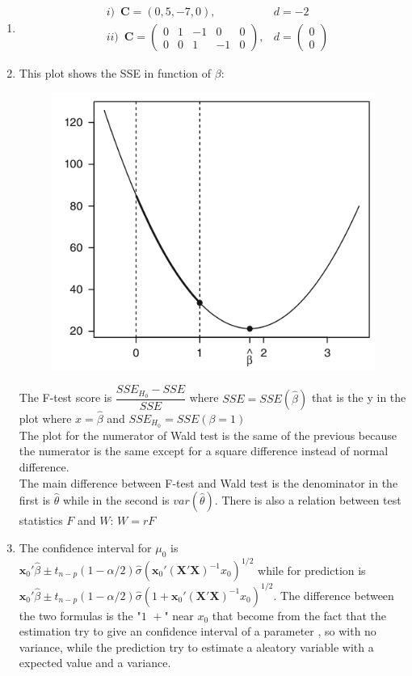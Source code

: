 \documentclass[10pt,a4paper]{article}
\author{Michele De Vita}
\begin{document}
	\begin{enumerate}
		\item  
		\begin{align*}
	 &i) \,\,\, \mathbf{C} = (0,  5, -7, 0), &d = -2  \\
		& ii) \,\,\, \mathbf{C} = \left( \begin{matrix}
		0 & 1 & -1 & 0 & 0 \\ 
		0 & 0 & 1 & -1 & 0 
		\end{matrix} \right) ,  &d= \left( \begin{matrix}
		0 \\ 
		0
		\end{matrix} \right)
		\end{align*}
		\item 
		This plot shows the SSE in function of $ \beta $:
		\begin{figure}[H]
			\centering
			\includegraphics[width=0.7\linewidth]{plot_ftest}
		\end{figure}
		The F-test score is $ \dfrac{SSE_{H_0} - SSE}{SSE} $ where $ SSE = SSE(\hat{\beta}) $ that is the y in the plot where $ x = \hat{\beta} $ and $ SSE_{H_0} = SSE(\beta = 1) $\\
		The plot for the numerator of Wald test is the same of the previous because the numerator is the same except for a square difference instead of normal difference.\\
		The main difference between F-test and Wald test is the denominator in the first is $ \hat{\theta} $ while in the second is $ var(\hat{\theta}) $. There is also a relation between test statistics $ F $ and $ W $: $ W = rF $
		\item The confidence interval for $ \mu_0  $ is $ \mathbf{x}_0' \hat{\beta} \pm t_{n-p}(1-\alpha / 2) \hat{\sigma} (\mathbf{x}_0' (\mathbf{X'X})^{-1} x_0)^{1/2}$ while for prediction is $ \mathbf{x}_0' \hat{\beta} \pm t_{n-p}(1-\alpha / 2) \hat{\sigma} (1 + \mathbf{x}_0' (\mathbf{X'X})^{-1} x_0)^{1/2}$. The difference between the two formulas is the "$ 1\,\,+ $" near $ x_0 $ that become from the fact that the estimation try to give an confidence interval of a parameter , so with no variance, while the prediction try to estimate a aleatory variable with a expected value and a variance.

\end{enumerate}
\end{document}
